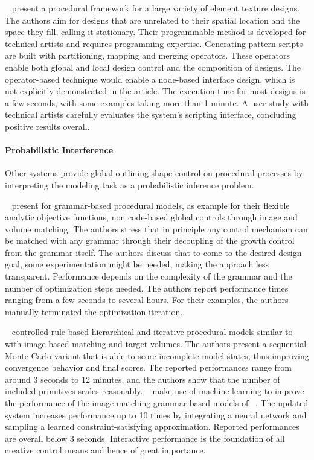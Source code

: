 \citeauthor*{loi_2017_pae}~\cite{loi_2017_pae} present a procedural framework for a large variety of element texture designs. The authors aim for designs that are unrelated to their spatial location and the space they fill, calling it stationary. Their programmable method is developed for technical artists and requires programming expertise. Generating pattern scripts are built with partitioning, mapping and merging operators. These operators enable both global and local design control and the composition of designs. The operator-based technique would enable a node-based interface design, which is not explicitly demonstrated in the article. The execution time for most designs is a few seconds, with some examples taking more than 1 minute. A user study with technical artists carefully evaluates the system's scripting interface, concluding positive results overall.

\paragraph*{Probabilistic Interference}
\label{para:analysis_rulebased_shapes_probabilistic}

Other systems provide global outlining shape control on procedural processes by interpreting the modeling task as a probabilistic inference problem.

\citeauthor*{talton_2011_mpm}~\cite{talton_2011_mpm} present for grammar-based procedural models, as example for their flexible analytic objective functions, non code-based global controls through image and volume matching. The authors stress that in principle any control mechanism can be matched with any grammar through their decoupling of the growth control from the grammar itself. The authors discuss that to come to the desired design goal, some experimentation might be needed, making the approach less transparent. Performance depends on the complexity of the grammar and the number of optimization steps needed. The authors report performance times ranging from a few seconds to several hours. For their examples, the authors manually terminated the optimization iteration.

\citeauthor*{ritchie_2015_cpm}~\cite{ritchie_2015_cpm} controlled rule-based hierarchical and iterative procedural models similar to \citeauthor*{talton_2011_mpm}~\cite{talton_2011_mpm} with image-based matching and target volumes. The authors present a sequential Monte Carlo variant that is able to score incomplete model states, thus improving convergence behavior and final scores. The reported performances range from around 3 seconds to 12 minutes, and the authors show that the number of included primitives scales reasonably. \citeauthor*{ritchie_2016_ngp}~\cite{ritchie_2016_ngp} make use of machine learning to improve the performance of the image-matching grammar-based models of \citeauthor*{ritchie_2015_cpm}~\cite{ritchie_2015_cpm}. The updated system increases performance up to 10 times by integrating a neural network and sampling a learned constraint-satisfying approximation. Reported performances are overall below 3 seconds. Interactive performance is the foundation of all creative control means and hence of great importance.

